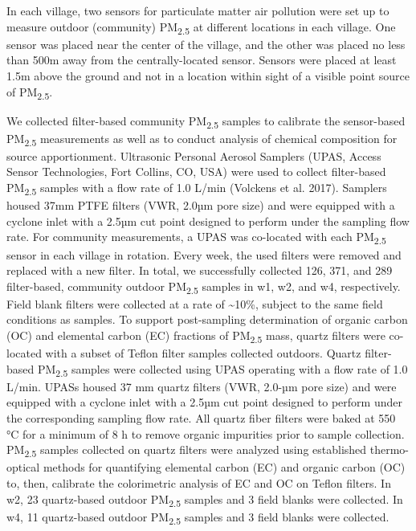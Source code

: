 \documentclass[
  letterpaper,
  DIV=11,
  numbers=noendperiod]{scrartcl}
\begin{document}
In each village, two sensors for particulate matter air pollution were
set up to measure outdoor (community) PM\textsubscript{2.5} at different
locations in each village. One sensor was placed near the center of the
village, and the other was placed no less than 500m away from the
centrally-located sensor. Sensors were placed at least 1.5m above the
ground and not in a location within sight of a visible point source of
PM\textsubscript{2.5}.

We collected filter-based community PM\textsubscript{2.5} samples to
calibrate the sensor-based PM\textsubscript{2.5} measurements as well as
to conduct analysis of chemical composition for source apportionment.
Ultrasonic Personal Aerosol Samplers (UPAS, Access Sensor Technologies,
Fort Collins, CO, USA) were used to collect filter-based
PM\textsubscript{2.5} samples with a flow rate of 1.0 L/min (Volckens et
al. 2017). Samplers housed 37mm PTFE filters (VWR, 2.0µm pore size) and
were equipped with a cyclone inlet with a 2.5µm cut point designed to
perform under the sampling flow rate. For community measurements, a UPAS
was co-located with each PM\textsubscript{2.5} sensor in each village in
rotation. Every week, the used filters were removed and replaced with a
new filter. In total, we successfully collected 126, 371, and 289
filter-based, community outdoor PM\textsubscript{2.5} samples in w1, w2,
and w4, respectively. Field blank filters were collected at a rate of
\textasciitilde10\%, subject to the same field conditions as samples. To
support post-sampling determination of organic carbon (OC) and elemental
carbon (EC) fractions of PM\textsubscript{2.5} mass, quartz filters were
co-located with a subset of Teflon filter samples collected outdoors.
Quartz filter-based PM\textsubscript{2.5} samples were collected using
UPAS operating with a flow rate of 1.0 L/min. UPASs housed 37 mm quartz
filters (VWR, 2.0-µm pore size) and were equipped with a cyclone inlet
with a 2.5µm cut point designed to perform under the corresponding
sampling flow rate. All quartz fiber filters were baked at 550 °C for a
minimum of 8 h to remove organic impurities prior to sample collection.
PM\textsubscript{2.5} samples collected on quartz filters were analyzed
using established thermo-optical methods for quantifying elemental
carbon (EC) and organic carbon (OC) to, then, calibrate the colorimetric
analysis of EC and OC on Teflon filters. In w2, 23 quartz-based outdoor
PM\textsubscript{2.5} samples and 3 field blanks were collected. In w4,
11 quartz-based outdoor PM\textsubscript{2.5} samples and 3 field blanks
were collected.
\end{document}
